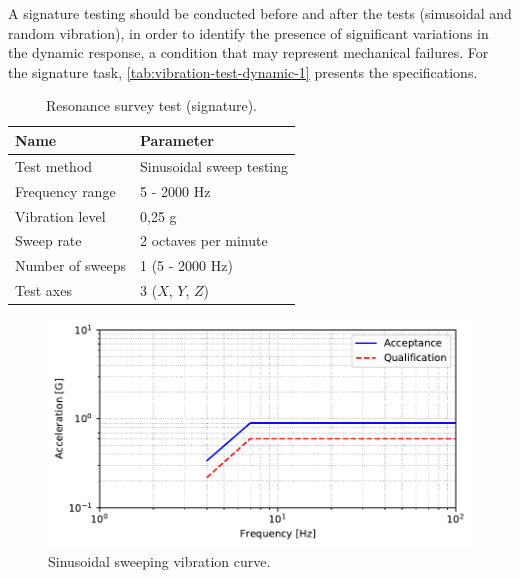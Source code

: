 A signature testing should be conducted before and after the tests (sinusoidal and random vibration), in order to identify the presence of significant variations in the dynamic response, a condition that may represent mechanical failures. For the signature task, \autoref{tab:vibration-test-dynamic-1} presents the specifications.

\begin{table}[!h]
    \begin{center}
        \begin{tabular}{ll}
            \toprule[1.5pt]
            \textbf{Name}    & \textbf{Parameter}       \\
            \midrule
            Test method      & Sinusoidal sweep testing \\
            Frequency range  & 5 - 2000 Hz              \\
            Vibration level  & 0,25 g                   \\
            Sweep rate       & 2 octaves per minute     \\
            Number of sweeps & 1 (5 - 2000 Hz)          \\
            Test axes        & 3 ($X$, $Y$, $Z$)        \\
            \bottomrule[1.5pt]
        \end{tabular}
        \caption{Resonance survey test (signature).}
        \label{tab:vibration-test-dynamic-1}
    \end{center}
\end{table}


\begin{figure}[!ht]
    \begin{center}
        \includegraphics[width=\textwidth]{curves/sine_test.pdf}
        \caption{Sinusoidal sweeping vibration curve.}
        \label{fig:vibration-sinusoidal-curve}
    \end{center}
\end{figure}

